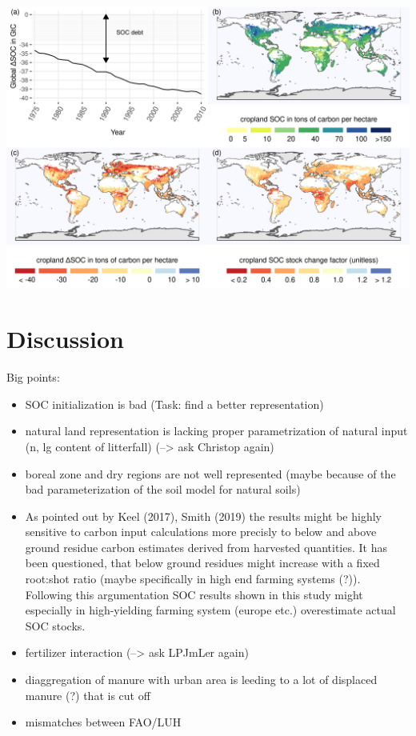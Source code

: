 \documentclass[gc, manuscript]{copernicus}
\begin{document}
\includegraphics[width=16cm]{../ResultNotebooks/Output/Images/4panelfigure}
\newpage

\section{Discussion}

Big points:

\begin{itemize}
\item
  SOC initialization is bad (Task: find a better representation)
\item
  natural land representation is lacking proper parametrization of
  natural input (n, lg content of litterfall) (--\textgreater{} ask
  Christop again)
\item
  boreal zone and dry regions are not well represented (maybe because of
  the bad parameterization of the soil model for natural soils)
\item
  As pointed out by Keel (2017), Smith (2019) the results might be
  highly sensitive to carbon input calculations more precisly to below
  and above ground residue carbon estimates derived from harvested
  quantities. It has been questioned, that below ground residues might
  increase with a fixed root:shot ratio (maybe specifically in high end
  farming systems (?)). Following this argumentation SOC results shown
  in this study might especially in high-yielding farming system (europe
  etc.) overestimate actual SOC stocks.
\item
  fertilizer interaction (--\textgreater{} ask LPJmLer again)
\item
  diaggregation of manure with urban area is leeding to a lot of
  displaced manure (?) that is cut off
\item
  mismatches between FAO/LUH
\end{itemize}
\end{document}
